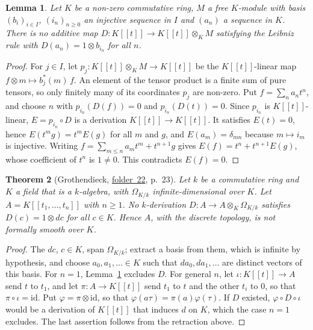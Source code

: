 \documentclass[11pt,a4paper]{amsart}
\newtheorem{theorem}{Theorem}[section]
\newtheorem{lemma}[theorem]{Lemma}
\theoremstyle{definition}
\theoremstyle{remark}
\newcommand{\fac}[1]{\href{https://grothendieck.umontpellier.fr/#1.pdf}{folder~#1}}
\begin{document}
\begin{lemma}\label{lem:obstruction}
Let $K$ be a non-zero commutative ring, $M$ a free $K$-module with basis $(b_i)_{i \in I}$, $(i_n)_{n \ge 0}$ an injective sequence in $I$ and $(a_n)$ a sequence in $K$. There is no additive map $D\colon K[[t]] \to K[[t]] \otimes_K M$ satisfying the Leibniz rule with $D(a_n) = 1 \otimes b_{i_n}$ for all $n$.
\end{lemma}

\begin{proof}
For $j \in I$, let $p_j\colon K[[t]] \otimes_K M \to K[[t]]$ be the $K[[t]]$-linear map $f \otimes m \mapsto b_j^*(m)\,f$. An element of the tensor product is a finite sum of pure tensors, so only finitely many of its coordinates $p_j$ are non-zero. Put $f = \sum_n a_nt^n$, and choose $n$ with $p_{i_n}(D(f)) = 0$ and $p_{i_n}(D(t)) = 0$. Since $p_{i_n}$ is $K[[t]]$-linear, $E = p_{i_n} \circ D$ is a derivation $K[[t]] \to K[[t]]$. It satisfies $E(t) = 0$, hence $E(t^mg) = t^mE(g)$ for all $m$ and $g$, and $E(a_m) = \delta_{mn}$ because $m \mapsto i_m$ is injective. Writing $f = \sum_{m \le n}a_mt^m + t^{n+1}g$ gives $E(f) = t^n + t^{n+1}E(g)$, whose coefficient of $t^n$ is $1 \ne 0$. This contradicts $E(f) = 0$.
\end{proof}

\begin{theorem}[Grothendieck, \fac{22}, p.~23]\label{thm:power}
Let $k$ be a commutative ring and $K$ a field that is a $k$-algebra, with $\Omega_{K/k}$ infinite-dimensional over $K$. Let $A = K[[t_1, \dots, t_n]]$ with $n \ge 1$. No $k$-derivation $D\colon A \to A \otimes_K \Omega_{K/k}$ satisfies $D(c) = 1 \otimes dc$ for all $c \in K$. Hence $A$, with the discrete topology, is not formally smooth over $K$.
\end{theorem}

\begin{proof}
The $dc$, $c \in K$, span $\Omega_{K/k}$; extract a basis from them, which is infinite by hypothesis, and choose $a_0, a_1, \ldots \in K$ such that $da_0, da_1, \ldots$ are distinct vectors of this basis. For $n = 1$, Lemma~\ref{lem:obstruction} excludes $D$. For general $n$, let $\iota\colon K[[t]] \to A$ send $t$ to $t_1$, and let $\pi\colon A \to K[[t]]$ send $t_1$ to $t$ and the other $t_i$ to $0$, so that $\pi \circ \iota = \mathrm{id}$. Put $\varphi = \pi \otimes \mathrm{id}$, so that $\varphi(a\tau) = \pi(a)\varphi(\tau)$. If $D$ existed, $\varphi \circ D \circ \iota$ would be a derivation of $K[[t]]$ that induces $d$ on $K$, which the case $n = 1$ excludes. The last assertion follows from the retraction above.
\end{proof}
\end{document}
